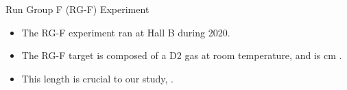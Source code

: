 \begin{frame}{Run Group F (RG-F) Experiment}
    \label{10.41::rgf_experiment}

    \begin{itemize}
        \item
            The RG-F experiment ran at Hall B during 2020.

        \item
            The RG-F target is composed of a D2 gas at room temperature, and is  \textcolor{efd_green}{cm} .

        \item
            This length is crucial to our study, .
    \end{itemize}

\end{frame}
